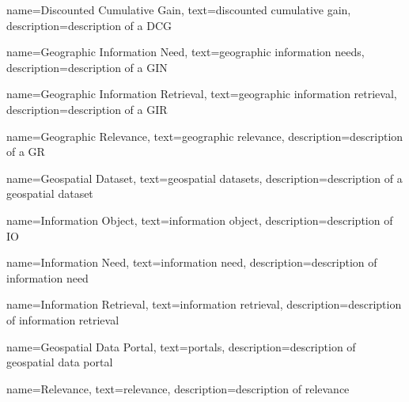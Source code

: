 
{
    name=Discounted Cumulative Gain,
    text=discounted cumulative gain,
    description=description of a DCG
}

{
    name=Geographic Information Need,
    text=geographic information needs,
    description=description of a GIN
}

{
    name=Geographic Information Retrieval,
    text=geographic information retrieval,
    description=description of a GIR
}

{
    name=Geographic Relevance,
    text=geographic relevance,
    description=description of a GR
}

{
    name=Geospatial Dataset,
    text=geospatial datasets,
    description=description of a geospatial dataset
}

{
    name=Information Object,
    text=information object,
    description=description of IO
}

{
    name=Information Need,
    text=information need,
    description=description of information need
}

{
    name=Information Retrieval,
    text=information retrieval,
    description=description of information retrieval
}

{
    name=Geospatial Data Portal,
    text=portals,
    description=description of geospatial data portal
}

{
    name=Relevance,
    text=relevance,
    description=description of relevance
}